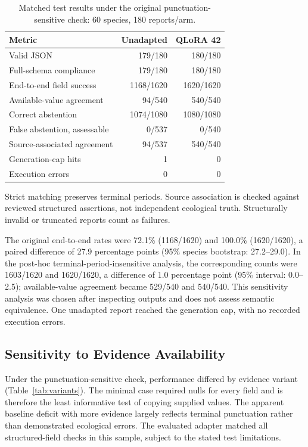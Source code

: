 \documentclass[a4paper,conference,10pt]{IEEEtran}
\begin{document}
\begin{table}[t]
\centering
\caption{Matched test results under the original punctuation-sensitive check: 60 species, 180 reports/arm.}
\label{tab:main}
\footnotesize
\begin{tabularx}{\columnwidth}{@{}>{\raggedright\arraybackslash}Xrr@{}}
\toprule
\textbf{Metric} & \textbf{Unadapted} & \textbf{QLoRA 42} \\
\midrule
Valid JSON & 179/180 & 180/180 \\
Full-schema compliance & 179/180 & 180/180 \\
End-to-end field success & 1168/1620 & 1620/1620 \\
Available-value agreement & 94/540 & 540/540 \\
Correct abstention & 1074/1080 & 1080/1080 \\
False abstention, assessable & 0/537 & 0/540 \\
Source-associated agreement & 94/537 & 540/540 \\
Generation-cap hits & 1 & 0 \\
Execution errors & 0 & 0 \\
\bottomrule
\end{tabularx}
\par\vspace{1mm}
\raggedright\scriptsize Strict matching preserves terminal periods. Source association is checked against reviewed structured assertions, not independent ecological truth. Structurally invalid or truncated reports count as failures.
\end{table}

The original end-to-end rates were 72.1\% (1168/1620) and 100.0\% (1620/1620), a paired difference of 27.9 percentage points (95\% species bootstrap: 27.2--29.0). In the post-hoc terminal-period-insensitive analysis, the corresponding counts were 1603/1620 and 1620/1620, a difference of 1.0 percentage point (95\% interval: 0.0--2.5); available-value agreement became 529/540 and 540/540. This sensitivity analysis was chosen after inspecting outputs and does not assess semantic equivalence. One unadapted report reached the generation cap, with no recorded execution errors.

\subsection{Sensitivity to Evidence Availability}
Under the punctuation-sensitive check, performance differed by evidence variant (Table~\ref{tab:variants}). The minimal case required nulls for every field and is therefore the least informative test of copying supplied values. The apparent baseline deficit with more evidence largely reflects terminal punctuation rather than demonstrated ecological errors. The evaluated adapter matched all structured-field checks in this sample, subject to the stated test limitations.
\end{document}
